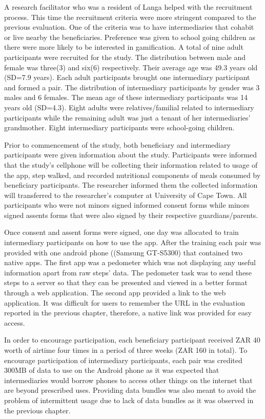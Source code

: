 A research facilitator who was a resident of Langa helped with the recruitment process. This time the recruitment criteria were more stringent compared to the previous evaluation. One of the criteria was to have intermediaries that cohabit or live nearby the beneficiaries. Preference was given to school going children as there were more likely to be interested in gamification. A total of nine adult participants were recruited for the study. The distribution between male and female was three(3) and six(6) respectively. Their average age was 49.3 years old (SD=7.9 years). Each adult participants brought one intermediary participant and formed a pair. The distribution of intermediary participants by gender was 3 males and 6 females. The mean age of these intermediary participants was 14 years old (SD=4.3).  Eight adults  were relatives/familial related to intermediary participants while the remaining adult was just a tenant of her intermediaries' grandmother. Eight intermediary participants were school-going children.

Prior to commencement of the study, both beneficiary and intermediary participants were given information about the study. Participants were informed that the study's cellphone will be collecting their information related to usage of the app, step walked,  and recorded nutritional components of meals consumed by beneficiary participants. The researcher informed them the collected information will transferred to the researcher's computer at University of Cape Town. All participants who were not minors signed informed consent forms while minors signed assents forms that were also signed by their respective guardians/parents.

Once consent and assent forms were signed, one day was allocated to train intermediary participants on how to use the app. After the training each pair was provided with one android phone ((Samsung
GT-S5300) that contained two native apps. The first app was a pedometer which was not displaying any useful information apart from raw steps' data. The pedometer task was to send these steps to a server so that they can be presented  and viewed in a better format through a web application. The second app provided a link to the web application. It was difficult for users to remember the URL in the evaluation reported in the previous chapter, therefore, a native link was provided for easy access.

In order to encourage participation, each beneficiary participant received ZAR 40 worth of airtime four times in a period of three weeks (ZAR 160 in total). To encourage participation of intermediary participants, each pair was credited 300MB of data to use on the Android phone as it was expected that intermediaries would borrow phones to access other things on the internet that are beyond prescribed uses. Providing data bundles was also meant to avoid the problem of intermittent usage due to lack of data bundles as it was observed in the previous chapter.

